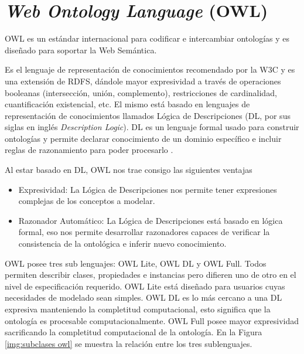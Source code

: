 \section{\textit{ Web Ontology Language }(OWL)}
OWL es un estándar internacional para codificar e intercambiar ontologías y es diseñado para soportar la Web Semántica.

Es el lenguaje de representación de conocimientos recomendado por la W3C y es una extensión de RDFS, dándole mayor expresividad a través de operaciones booleanas (intersección, unión, complemento), restricciones de cardinalidad, cuantificación existencial, etc. El mismo está basado en lenguajes de representación de conocimientos llamados Lógica de Descripciones (DL, por sus siglas en inglés \textit{Description Logic}). DL es un lenguaje formal usado para construir ontologías y permite declarar conocimiento de un dominio específico e incluir reglas de razonamiento para poder procesarlo \cite{kalibatiene2011survey}.

Al estar basado en DL, OWL nos trae consigo las siguientes ventajas
\begin{itemize}
    \item Expresividad: La Lógica de Descripciones nos permite tener expresiones complejas de los conceptos a modelar.
    \item Razonador Automático: La Lógica de Descripciones está basado en lógica formal, eso nos permite desarrollar razonadores capaces de verificar la consistencia de la ontológica e inferir nuevo conocimiento.
\end{itemize}

OWL posee tres sub lenguajes\cite{owllevels}: OWL Lite, OWL DL y OWL Full. Todos permiten describir clases, propiedades e instancias pero difieren uno de otro en el nivel de especificación requerido. OWL Lite está diseñado para usuarios cuyas necesidades de modelado sean simples. OWL DL es lo más cercano a una DL expresiva manteniendo la completitud computacional, esto significa que la ontología es procesable computacionalmente. OWL Full posee mayor expresividad sacrificando la completitud computacional de la ontología. En la Figura \ref{img:subclases owl} se muestra la relación entre los tres sublenguajes.

